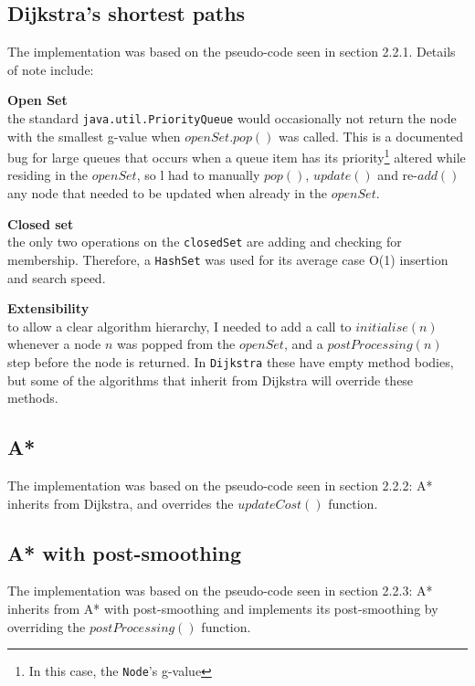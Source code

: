 \documentclass[12pt,notitlepage]{report}
\begin{document}
\subsection{Dijkstra's shortest paths}

The implementation was based on the pseudo-code seen in section 2.2.1. Details of note include:
\begin{description}
  \item {\bf Open Set}\\ \hfill
  the standard {\tt java.util.PriorityQueue} would occasionally not return the node with the smallest g-value when $openSet.pop()$ was called. This is a documented bug for large queues that occurs when a queue item has its priority\footnote{In this case, the {\tt Node}'s g-value} altered while residing in the $openSet$, so l had to manually $pop()$, $update()$ and re-$add()$ any node that needed to be updated when already in the $openSet$.
  \item {\bf Closed set}\\ \hfill
  the only two operations on the {\tt closedSet} are adding and checking for membership. Therefore, a {\tt HashSet} was used for its average case O(1) insertion and search speed.
  \item {\bf Extensibility} \\ \hfill
  to allow a clear algorithm hierarchy, I needed to add a call to $initialise(n)$ whenever a node $n$ was popped from the $openSet$, and a $postProcessing(n)$ step before the node is returned. In {\tt Dijkstra} these have empty method bodies, but some of the algorithms that inherit from Dijkstra will override these methods.
  \end{description}


\subsection{A*}

The implementation was based on the pseudo-code seen in section 2.2.2: A* inherits from Dijkstra, and overrides the $updateCost()$ function.

\subsection{A* with post-smoothing}

The implementation was based on the pseudo-code seen in section 2.2.3: A* inherits from A* with post-smoothing and implements its post-smoothing by overriding the $postProcessing()$ function.\\
\end{document}

